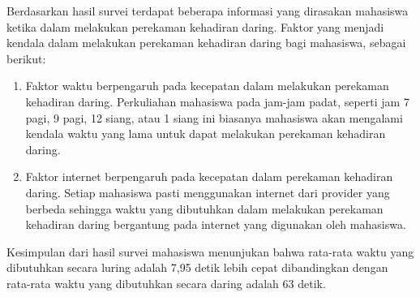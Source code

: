 Berdasarkan hasil survei terdapat beberapa informasi yang dirasakan mahasiswa ketika dalam melakukan perekaman kehadiran daring. Faktor yang menjadi kendala dalam melakukan perekaman kehadiran daring bagi mahasiswa, sebagai berikut:
\begin{enumerate}
	\item Faktor waktu berpengaruh pada kecepatan dalam melakukan perekaman kehadiran daring. Perkuliahan mahasiswa pada jam-jam padat, seperti jam 7 pagi, 9 pagi, 12 siang, atau 1 siang ini biasanya mahasiswa akan mengalami kendala waktu yang lama untuk dapat melakukan perekaman kehadiran daring.
	\item Faktor internet berpengaruh pada kecepatan dalam perekaman kehadiran daring. Setiap mahasiswa pasti menggunakan internet dari provider yang berbeda sehingga waktu yang dibutuhkan dalam melakukan perekaman kehadiran daring bergantung pada internet yang digunakan oleh mahasiswa.
\end{enumerate}
Kesimpulan dari hasil survei mahasiswa menunjukan bahwa rata-rata waktu yang dibutuhkan secara luring adalah 7,95 detik lebih cepat dibandingkan dengan rata-rata waktu yang dibutuhkan secara daring adalah 63 detik.

